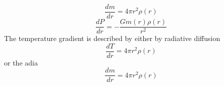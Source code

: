\begin{equation}
    \frac{dm}{dr} = 4\pi r^2 \rho(r)
\end{equation}
\begin{equation}
    \frac{dP}{dr} = -\frac{G m(r)\rho(r)}{r^2}
\end{equation}
The temperature gradient is described by either by radiative diffusion
\begin{equation}
    \frac{dT}{dr} = 4\pi r^2 \rho(r)
\end{equation}
or the adia
\begin{equation}
    \frac{dm}{dr} = 4\pi r^2 \rho(r)
\end{equation}
